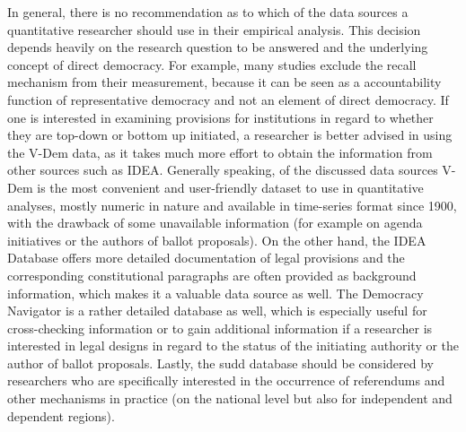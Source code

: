 \documentclass[]{article}
\begin{document}
In general, there is no recommendation as to which of the data sources a
quantitative researcher should use in their empirical analysis. This
decision depends heavily on the research question to be answered and the
underlying concept of direct democracy. For example, many studies
exclude the recall mechanism from their measurement, because it can be
seen as a accountability function of representative democracy and not an
element of direct democracy. If one is interested in examining
provisions for institutions in regard to whether they are top-down or
bottom up initiated, a researcher is better advised in using the V-Dem
data, as it takes much more effort to obtain the information from other
sources such as IDEA. Generally speaking, of the discussed data sources
V-Dem is the most convenient and user-friendly dataset to use in
quantitative analyses, mostly numeric in nature and available in
time-series format since 1900, with the drawback of some unavailable
information (for example on agenda initiatives or the authors of ballot
proposals). On the other hand, the IDEA Database offers more detailed
documentation of legal provisions and the corresponding constitutional
paragraphs are often provided as background information, which makes it
a valuable data source as well. The Democracy Navigator is a rather
detailed database as well, which is especially useful for cross-checking
information or to gain additional information if a researcher is
interested in legal designs in regard to the status of the initiating
authority or the author of ballot proposals. Lastly, the sudd database
should be considered by researchers who are specifically interested in
the occurrence of referendums and other mechanisms in practice (on the
national level but also for independent and dependent regions).
\end{document}
